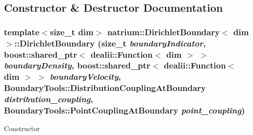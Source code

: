 \subsection{Constructor \& Destructor Documentation}
\hypertarget{classnatrium_1_1DirichletBoundary_a58366f152d702561d9d30584e2c6970b}{
\subsubsection[{DirichletBoundary}]{\setlength{\rightskip}{0pt plus 5cm}template$<$size\_\-t dim$>$ {\bf natrium::DirichletBoundary}$<$ dim $>$::{\bf DirichletBoundary} (size\_\-t {\em boundaryIndicator}, \/  boost::shared\_\-ptr$<$ dealii::Function$<$ dim $>$ $>$ {\em boundaryDensity}, \/  boost::shared\_\-ptr$<$ dealii::Function$<$ dim $>$ $>$ {\em boundaryVelocity}, \/  BoundaryTools::DistributionCouplingAtBoundary {\em distribution\_\-coupling}, \/  BoundaryTools::PointCouplingAtBoundary {\em point\_\-coupling})}}
\label{classnatrium_1_1DirichletBoundary_a58366f152d702561d9d30584e2c6970b}
Constructor 
